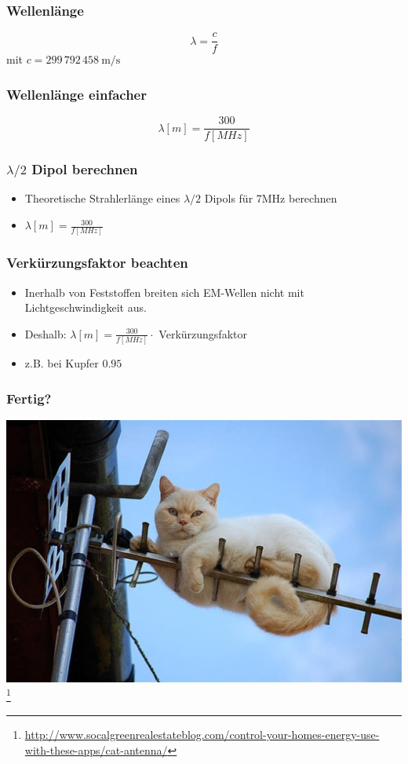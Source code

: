 \begin{frame}
    \frametitle{Wellenlänge}
    \begin{center} \huge
        $$\lambda = \frac{c}{f}$$
      	mit $c = 299\,792\,458 ~ \mathrm{m/s}$
	\end{center}
\end{frame}

\begin{frame}
    \frametitle{Wellenlänge einfacher}
    \begin{center} \huge
        $$\lambda [m] = \frac{300}{f[MHz]}$$
	\end{center}
\end{frame}

\begin{frame}
    \frametitle{$\lambda / 2$ Dipol berechnen}
    \begin{center}
	\begin{itemize} \Large
		\item Theoretische Strahlerlänge eines $\lambda / 2$ Dipols für 7MHz berechnen
		\item $\lambda[m] = \frac{300}{f[MHz]}$
    \end{itemize}
    \end{center}
\end{frame}

\begin{frame}
    \frametitle{Verkürzungsfaktor beachten}
    \begin{center}
	\begin{itemize} \Large
		\item Inerhalb von Feststoffen breiten sich EM-Wellen nicht mit Lichtgeschwindigkeit aus.
		\item Deshalb: $\lambda[m] = \frac{300}{f[MHz]} \cdot $ Verkürzungsfaktor
		\item z.B. bei Kupfer $0.95$
    \end{itemize}
    \end{center}
\end{frame}

\begin{frame}
    \frametitle{Fertig?}
    \begin{center}
        \includegraphics[width=.95\textwidth]{e11/cat-antenna.jpg}
        \footnote{\tiny \url{http://www.socalgreenrealestateblog.com/control-your-homes-energy-use-with-these-apps/cat-antenna/}}
	\end{center}
\end{frame}

